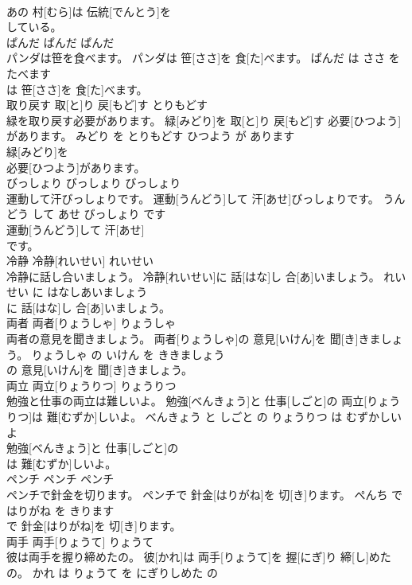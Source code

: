 \documentclass[8pt]{extreport}
\begin{document}
\begin{CJK}{UTF8}{min}
\\	あの 村[むら]は 伝統[でんとう]を
\\	している。			
\\	ぱんだ	ぱんだ	ぱんだ	
\\	パンダは笹を食べます。	パンダは 笹[ささ]を 食[た]べます。	ぱんだ は ささ を たべます	
\\	は 笹[ささ]を 食[た]べます。			
\\	取り戻す	取[と]り 戻[もど]す	とりもどす	
\\	緑を取り戻す必要があります。	緑[みどり]を 取[と]り 戻[もど]す 必要[ひつよう]があります。	みどり を とりもどす ひつよう が あります	
\\	緑[みどり]を
\\	必要[ひつよう]があります。			
\\	びっしょり	びっしょり	びっしょり	
\\	運動して汗びっしょりです。	運動[うんどう]して 汗[あせ]びっしょりです。	うんどう して あせ びっしょり です	
\\	運動[うんどう]して 汗[あせ]
\\	です。			
\\	冷静	冷静[れいせい]	れいせい	
\\	冷静に話し合いましょう。	冷静[れいせい]に 話[はな]し 合[あ]いましょう。	れいせい に はなしあいましょう	
\\	に 話[はな]し 合[あ]いましょう。			
\\	両者	両者[りょうしゃ]	りょうしゃ	
\\	両者の意見を聞きましょう。	両者[りょうしゃ]の 意見[いけん]を 聞[き]きましょう。	りょうしゃ の いけん を ききましょう	
\\	の 意見[いけん]を 聞[き]きましょう。			
\\	両立	両立[りょうりつ]	りょうりつ	
\\	勉強と仕事の両立は難しいよ。	勉強[べんきょう]と 仕事[しごと]の 両立[りょうりつ]は 難[むずか]しいよ。	べんきょう と しごと の りょうりつ は むずかしい よ	
\\	勉強[べんきょう]と 仕事[しごと]の
\\	は 難[むずか]しいよ。			
\\	ペンチ	ペンチ	ペンチ	
\\	ペンチで針金を切ります。	ペンチで 針金[はりがね]を 切[き]ります。	ぺんち で はりがね を きります	
\\	で 針金[はりがね]を 切[き]ります。			
\\	両手	両手[りょうて]	りょうて	
\\	彼は両手を握り締めたの。	彼[かれ]は 両手[りょうて]を 握[にぎ]り 締[し]めたの。	かれ は りょうて を にぎりしめた の	

\end{CJK}
\end{document}
